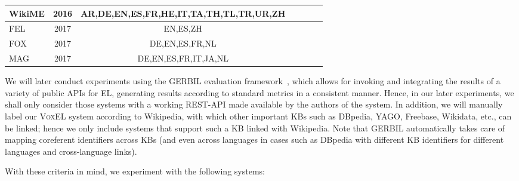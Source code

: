 \documentclass{llncs}
\newcommand{\cmark}{\ding{51}}%
\newcommand{\xmark}{\ding{55}}%
\begin{document}
\begin{table}[t]
{\begin{tabular}{lcccccr}
		WikiME \cite{Cross-Lingual-Wikifier-tsai2016cross} & 2016 & AR,DE,EN,ES,FR,HE,IT,TA,TH,TL,TR,UR,ZH&\cmark&\cmark&\xmark&\xmark\\\midrule		
		
		FEL~\cite{FEL-pappu2017lightweight}& 2017 &EN,ES,ZH&\cmark&\xmark&\cmark&\xmark\\\midrule
        
		FOX~\cite{fox2017}&2017&DE,EN,ES,FR,NL&\cmark&\cmark&\cmark&\cmark\\\midrule
        
        MAG \cite{mag2017}& 2017 & DE,EN,ES,FR,IT,JA,NL&\xmark&\cmark&\cmark&\cmark\\
		
		\bottomrule
	\end{tabular}
}
\end{table}

We will later conduct experiments using the GERBIL evaluation framework~\cite{gerbil-2015}, which allows for invoking and integrating the results of a variety of public APIs for EL, generating results according to standard metrics in a consistent manner. Hence, in our later experiments, we shall only consider those systems with a working REST-API made available by the authors of the system. In addition, we will manually label our \textsc{VoxEL} system according to Wikipedia, with which other important KBs such as DBpedia, YAGO, Freebase, Wikidata, etc., can be linked; hence we only include systems that support such a KB linked with Wikipedia. Note that GERBIL automatically takes care of mapping coreferent identifiers across KBs (and even across languages in cases such as DBpedia with different KB identifiers for different languages and cross-language links). 

With these criteria in mind, we experiment with the following systems: 
\end{document}
